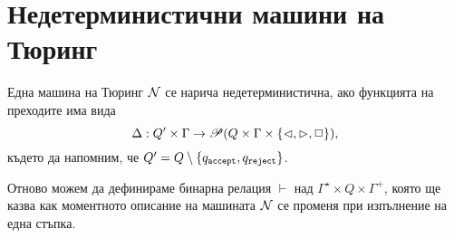 \section{Недетерминистични машини на Тюринг}

Една машина на Тюринг $\N$ се нарича недетерминистична, ако функцията на преходите има вида
\[\Delta: Q'\times \Gamma \to \Ps(Q \times \Gamma\times \{\goleft,\goright,\stay\}), \]
където да напомним, че $Q' = Q \setminus \{\qaccept,\qreject\}$.

Отново можем да дефинираме бинарна релация $\vdash$ над $\Gamma^\star \times Q \times \Gamma^+$,
която ще казва как моментното описание на машината $\N$ се променя при изпълнение на една стъпка.

\begin{figure}[H]
  \begin{subfigure}[b]{0.5\textwidth}
    \begin{prooftree}
    \end{prooftree}
    \vspace*{2mm}
  \end{subfigure}
  ~
\begin{subfigure}[b]{0.5\textwidth}
\begin{prooftree}
\end{prooftree}
\vspace*{2mm}
\end{subfigure}

\begin{subfigure}[b]{0.5\textwidth}
\begin{prooftree}
\end{prooftree}
\vspace*{2mm}
\end{subfigure}
~
\begin{subfigure}[b]{0.5\textwidth}
  \begin{prooftree}
  \end{prooftree}
  \vspace*{2mm}
\end{subfigure}

\begin{prooftree}
\end{prooftree}
\end{figure}

